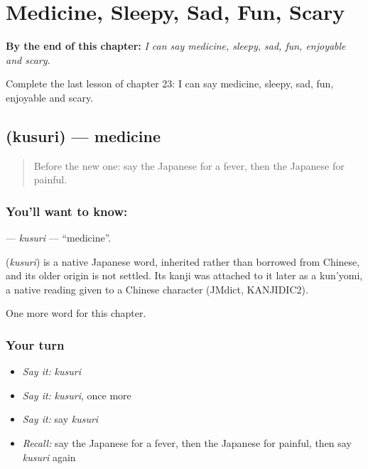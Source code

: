 
\chapter{Medicine, Sleepy, Sad, Fun, Scary}
\label{ch:ja-medicine-sleepy-sad-fun-scary}

\begin{chapteropening}
\textbf{By the end of this chapter:} \emph{I can say medicine, sleepy, sad, fun, enjoyable and scary.}

Complete the last lesson of chapter 23: I can say medicine, sleepy, sad, fun, enjoyable and scary.
\end{chapteropening}

\section[\texorpdfstring{\ja{くすり} (kusuri)}{くすり (kusuri)}]{ (kusuri) — medicine}

\label{lesson:JA-C23-kusuri}



\begin{quote}
Before the new one: say the Japanese for a fever, then the Japanese for painful.
\end{quote}

\subsection*{You'll want to know: }
\textbf{} — \emph{kusuri} — \textquotedblleft{}medicine\textquotedblright{}.

\begin{cousinweb}
\textbf{} (\emph{kusuri}) is a native Japanese word, inherited rather than borrowed from Chinese, and its older origin is not settled. Its kanji was attached to it later as a kun'yomi, a native reading given to a Chinese character (JMdict, KANJIDIC2).
\end{cousinweb}

\begin{grammarlens}[title={What you've built}]
One more word for this chapter.
\end{grammarlens}

\subsection*{Your turn}
\begin{itemize}
\raggedright
  \item \emph{Say it:} \emph{kusuri}
  \item \emph{Say it:} \emph{kusuri}, once more
  \item \emph{Say it:} say \emph{kusuri}
  \item \emph{Recall:} say the Japanese for a fever, then the Japanese for painful, then say \emph{kusuri} again
\end{itemize}

